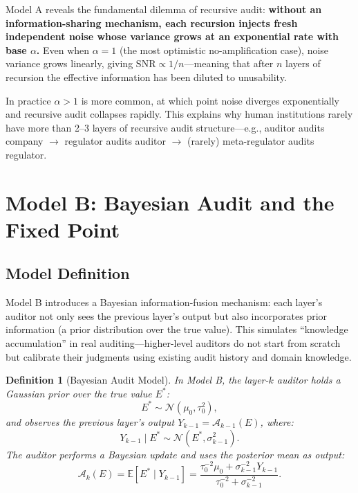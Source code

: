 \documentclass[12pt,a4paper]{article}
\newtheorem{definition}[theorem]{Definition}
\theoremstyle{definition}
\newcommand{\E}{\mathbb{E}}
\newcommand{\AuditOp}{\mathcal{A}}
\newcommand{\SNR}{\mathrm{SNR}}
\begin{document}
\noindent
Model A reveals the fundamental dilemma of recursive audit: \textbf{without an information-sharing mechanism, each recursion injects fresh independent noise whose variance grows at an exponential rate with base $\alpha$.} Even when $\alpha = 1$ (the most optimistic no-amplification case), noise variance grows linearly, giving $\SNR \propto 1/n$---meaning that after $n$ layers of recursion the effective information has been diluted to unusability.

In practice $\alpha > 1$ is more common, at which point noise diverges exponentially and recursive audit collapses rapidly. This explains why human institutions rarely have more than 2--3 layers of recursive audit structure---e.g., auditor audits company $\to$ regulator audits auditor $\to$ (rarely) meta-regulator audits regulator.

\section{Model B: Bayesian Audit and the Fixed Point}

\subsection{Model Definition}

\noindent
Model B introduces a Bayesian information-fusion mechanism: each layer's auditor not only sees the previous layer's output but also incorporates prior information (a prior distribution over the true value). This simulates ``knowledge accumulation'' in real auditing---higher-level auditors do not start from scratch but calibrate their judgments using existing audit history and domain knowledge.

\begin{definition}[Bayesian Audit Model]\label{def:model_b}
In Model B, the layer-$k$ auditor holds a Gaussian prior over the true value $E^*$:
\begin{equation}\label{eq:model_b_prior}
    E^* \sim \mathcal{N}(\mu_0, \tau_0^2),
\end{equation}
and observes the previous layer's output $Y_{k-1} = \AuditOp_{k-1}(E)$, where:
\begin{equation}\label{eq:model_b_obs}
    Y_{k-1} \mid E^* \sim \mathcal{N}(E^*, \sigma_{k-1}^2).
\end{equation}
The auditor performs a Bayesian update and uses the posterior mean as output:
\begin{equation}\label{eq:model_b_posterior}
    \AuditOp_k(E) = \E[E^* \mid Y_{k-1}] = \frac{\tau_0^{-2} \mu_0 + \sigma_{k-1}^{-2} Y_{k-1}}{\tau_0^{-2} + \sigma_{k-1}^{-2}}.
\end{equation}
\end{definition}
\end{document}

